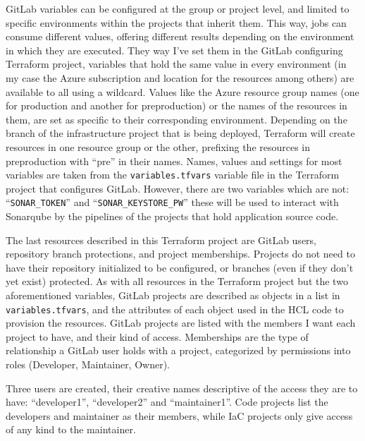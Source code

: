 \documentclass[11pt]{article}
\begin{document}
\begin{flushleft}
    GitLab variables can be configured at the group or project level, and limited to specific environments within the projects that inherit them. This way, jobs can consume different values, offering different results depending on the environment in which they are executed. They way I've set them in the GitLab configuring Terraform project, variables that hold the same value in every environment (in my case the Azure subscription and location for the resources among others) are available to all using a wildcard. Values like the Azure resource group names (one for production and another for preproduction) or the names of the resources in them, are set as specific to their corresponding environment. Depending on the branch of the infrastructure project that is being deployed, Terraform will create resources in one resource group or the other, prefixing the resources in preproduction with ``pre'' in their names. Names, values and settings for most variables are taken from the \texttt{variables.tfvars} variable file in the Terraform project that configures GitLab. However, there are two variables which are not: ``\texttt{SONAR\_TOKEN}'' and ``\texttt{SONAR\_KEYSTORE\_PW}'' these will be used to interact with Sonarqube by the pipelines of the projects that hold application source code.
    \linebreak

    The last resources described in this Terraform project are GitLab users, repository branch protections, and project memberships. Projects do not need to have their repository initialized to be configured, or branches (even if they don't yet exist) protected. As with all resources in the Terraform project but the two aforementioned variables, GitLab projects are described as objects in a list in \texttt{variables.tfvars}, and the attributes of each object used in the HCL code to provision the resources. GitLab projects are listed with the members I want each project to have, and their kind of access. Memberships are the type of relationship a GitLab user holds with a project, categorized by permissions into roles (Developer, Maintainer, Owner). 
    \linebreak
    
    Three users are created, their creative names descriptive of the access they are to have: ``developer1'', ``developer2'' and ``maintainer1''. Code projects list the developers and maintainer as their members, while IaC projects only give access of any kind to the maintainer.
    \linebreak
    

\end{flushleft}
\end{document}
